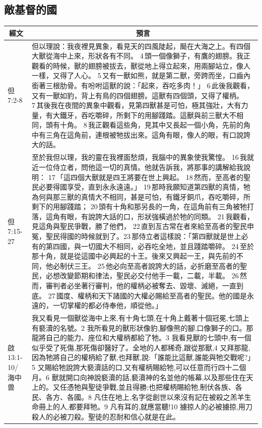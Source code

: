 \subsection{敵基督的國}
\begin{table}[H]
\centering
\begin{tabular}{p{}|p{}}\hline\hline
\multicolumn{1}{c|}{經文}&\multicolumn{1}{c}{預言}\\\hline  
但7:2-8&但以理說：我夜裡見異象，看見天的四風陡起，颳在大海之上。有四個大獸從海中上來，形狀各有不同。 4 頭一個像獅子，有鷹的翅膀。我正觀看的時候，獸的翅膀被拔去，獸從地上得立起來，用兩腳站立，像人一樣，又得了人心。 5 又有一獸如熊，就是第二獸，旁跨而坐，口齒內銜著三根肋骨。有吩咐這獸的說：「起來，吞吃多肉！」 6 此後我觀看，又有一獸如豹，背上有鳥的四個翅膀。這獸有四個頭，又得了權柄。 7 其後我在夜間的異象中觀看，見第四獸甚是可怕，極其強壯，大有力量，有大鐵牙，吞吃嚼碎，所剩下的用腳踐踏。這獸與前三獸大不相同，頭有十角。 8 我正觀看這些角，見其中又長起一個小角，先前的角中有三角在這角前，連根被牠拔出來。這角有眼，像人的眼，有口說誇大的話。 \\\hline

但7:15-27&至於我但以理，我的靈在我裡面愁煩，我腦中的異象使我驚惶。 16 我就近一位侍立者，問他這一切的真情。他就告訴我，將那事的講解給我說明： 17 「這四個大獸就是四王將要在世上興起。 18 然而，至高者的聖民必要得國享受，直到永永遠遠。」 19 那時我願知道第四獸的真情，牠為何與那三獸的真情大不相同，甚是可怕，有鐵牙銅爪，吞吃嚼碎，所剩下的用腳踐踏； 20 頭有十角和那另長的一角，在這角前有三角被牠打落，這角有眼，有說誇大話的口，形狀強橫過於牠的同類。 21 我觀看，見這角與聖民爭戰，勝了他們， 22 直到亙古常在者來給至高者的聖民申冤，聖民得國的時候就到了。23 那侍立者這樣說：「第四獸就是世上必有的第四國，與一切國大不相同，必吞吃全地，並且踐踏嚼碎。 24 至於那十角，就是從這國中必興起的十王。後來又興起一王，與先前的不同，他必制伏三王。 25 他必向至高者說誇大的話，必折磨至高者的聖民，必想改變節期和律法，聖民必交付他手一載，二載，半載。 26 然而，審判者必坐著行審判，他的權柄必被奪去、毀壞、滅絕，一直到底。 27 國度、權柄和天下諸國的大權必賜給至高者的聖民。他的國是永遠的，一切掌權的都必侍奉他，順從他。」 \\\hline

啟13:1-10/海中兽&我又看見一個獸從海中上來,有十角七頭,在十角上戴著十個冠冕,七頭上有褻瀆的名號。2 我所看見的獸形狀像豹,腳像熊的腳,口像獅子的口。那龍將自己的能力、座位和大權柄都給了牠。3 我看見獸的七頭中,有一個似乎受了死傷,那死傷卻醫好了。全地的人都稀奇,跟從那獸,4 又拜那龍,因為牠將自己的權柄給了獸,也拜獸,說:「誰能比這獸,誰能與牠交戰呢?」5 又賜給牠說誇大褻瀆話的口,又有權柄賜給牠,可以任意而行四十二個月。6 獸就開口向神說褻瀆的話,褻瀆神的名並他的帳幕,以及那些住在天上的。又任憑牠與聖徒爭戰,並且得勝;也把權柄賜給牠,制伏各族、各民、各方、各國。8 凡住在地上,名字從創世以來沒有記在被殺之羔羊生命冊上的人,都要拜牠。9 凡有耳的,就應當聽!10 擄掠人的必被擄掠,用刀殺人的必被刀殺。聖徒的忍耐和信心就是在此。 \\\hline


\end{tabular}
\end{table}
